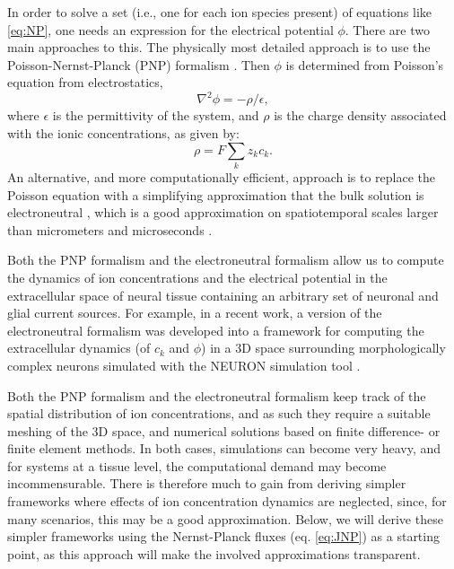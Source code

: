 \documentclass[preprint,11pt,authoryear]{elsarticle}
\begin{document}
In order to solve a set (i.e., one for each ion species present) of equations like \ref{eq:NP}, one needs an expression for the electrical potential $\phi$. There are two main approaches to this. The physically most detailed approach is to use the Poisson-Nernst-Planck (PNP) formalism \cite{Leonetti1998, Leonetti2004, Lu2007, Lopreore2008, Nanninga2008, Pods2013, Gardner2015}. Then $\phi$ is determined from Poisson's equation from electrostatics, 
\begin{equation}
\nabla^2 \phi = -\rho/\epsilon, 
\label{eq:poisson}
\end{equation}
where $\epsilon$ is the permittivity of the system, and $\rho$ is the charge density associated with the ionic concentrations, as given by:
\begin{equation}
\rho = F \sum_k z_k c_k.
\label{eq:poisson}
\end{equation}
An alternative, and more computationally efficient, approach is to replace the Poisson equation with a simplifying approximation that the bulk solution is electroneutral \cite{Mori2008, Mori2009, Mori2009a, Mori2011, Halnes2015, Halnes2013, Halnes2015arxiv, Pods2017, Niederer2013, OConnell2016, Solbra2018}, which is a good approximation on spatiotemporal scales larger than micrometers and microseconds \cite{Grodzinsky2011, Pods2017, Solbra2018}. 

Both the PNP formalism and the electroneutral formalism allow us to compute the dynamics of ion concentrations and the electrical potential in the extracellular space of neural tissue containing an arbitrary set of neuronal and glial current sources. For example, in a recent work, a version of the electroneutral formalism was developed into a framework for computing the extracellular dynamics (of $c_k$ and $\phi$) in a 3D space surrounding morphologically complex neurons simulated with the NEURON simulation tool \cite{Solbra2018}. 

Both the PNP formalism and the electroneutral formalism keep track of the spatial distribution of ion concentrations, and as such they require a suitable meshing of the 3D space, and numerical solutions based on finite difference- or finite element methods. In both cases, simulations can become very heavy, and for systems at a tissue level, the computational demand may become incommensurable. There is therefore much to gain from deriving simpler frameworks where effects of ion concentration dynamics are neglected, since, for many scenarios, this may be a good approximation. Below, we will derive these simpler frameworks using the Nernst-Planck fluxes (eq. \ref{eq:JNP}) as a starting point, as this approach will make the involved approximations transparent.
\end{document}

